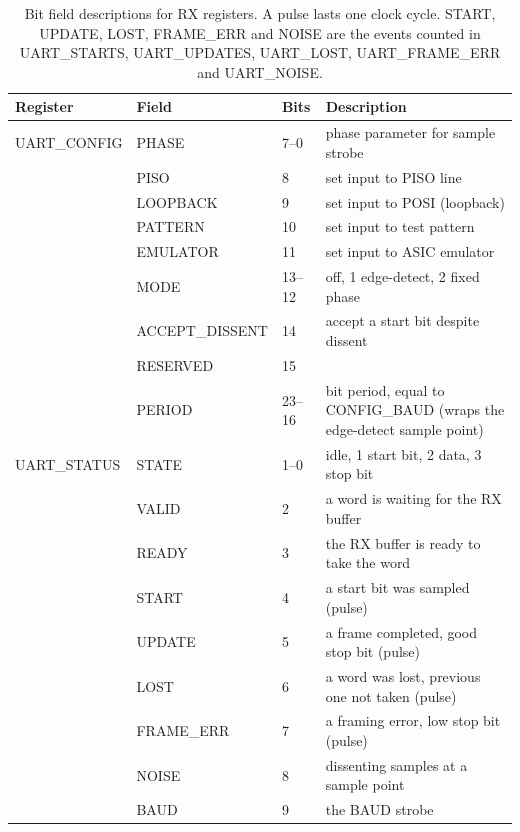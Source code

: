 \documentclass[12pt]{article}
\begin{document}
\begin{table}
\caption{\label{tbl:rx-bit-fields} Bit field descriptions for RX registers.  A pulse lasts one clock cycle.  START, UPDATE, LOST, FRAME\_ERR and NOISE are the events counted in UART\_STARTS, UART\_UPDATES, UART\_LOST, UART\_FRAME\_ERR and UART\_NOISE.}
\begin{center}
\begin{tabular}{lll>{\raggedright\arraybackslash}p{7.7cm}}
Register       & Field   & Bits   & Description \\
\hline
UART\_CONFIG   & PHASE    & 7--0  & phase parameter for sample strobe \\
               & PISO     & 8     & set input to PISO line \\
               & LOOPBACK & 9     & set input to POSI (loopback) \\
               & PATTERN  & 10    & set input to test pattern \\
               & EMULATOR & 11    & set input to ASIC emulator \\
               & MODE    & 13--12 & 0 off, 1 edge-detect, 2 fixed phase \\
               & ACCEPT\_DISSENT & 14 & accept a start bit despite dissent \\
               & RESERVED & 15     & \\
               & PERIOD  & 23--16 & bit period, equal to CONFIG\_BAUD (wraps the edge-detect sample point) \\
\hline
UART\_STATUS   & STATE   & 1--0   & 0 idle, 1 start bit, 2 data, 3 stop bit \\
               & VALID   & 2      & a word is waiting for the RX buffer \\
               & READY   & 3      & the RX buffer is ready to take the word \\
               & START   & 4      & a start bit was sampled (pulse) \\
               & UPDATE  & 5      & a frame completed, good stop bit (pulse) \\
               & LOST    & 6      & a word was lost, previous one not taken (pulse) \\
               & FRAME\_ERR & 7   & a framing error, low stop bit (pulse) \\
               & NOISE   & 8      & dissenting samples at a sample point \\
               & BAUD    & 9      & the BAUD strobe \\

\end{tabular}
\end{center}
\end{table}
\end{document}
